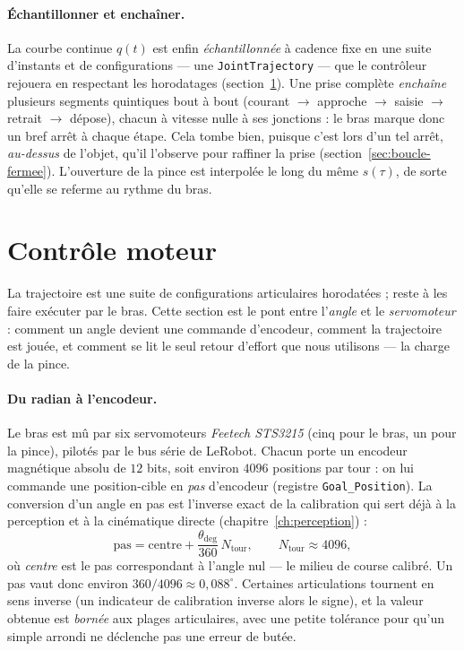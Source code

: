 \paragraph{Échantillonner et enchaîner.} La courbe continue $q(t)$ est enfin \emph{échantillonnée} à cadence fixe en une suite d'instants et de configurations --- une \texttt{JointTrajectory} --- que le contrôleur rejouera en respectant les horodatages (section~\ref{sec:moteur}). Une prise complète \emph{enchaîne} plusieurs segments quintiques bout à bout (courant $\to$ approche $\to$ saisie $\to$ retrait $\to$ dépose), chacun à vitesse nulle à ses jonctions : le bras marque donc un bref arrêt à chaque étape. Cela tombe bien, puisque c'est lors d'un tel arrêt, \emph{au-dessus} de l'objet, qu'il l'observe pour raffiner la prise (section~\ref{sec:boucle-fermee}). L'ouverture de la pince est interpolée le long du même $s(\tau)$, de sorte qu'elle se referme au rythme du bras.


\section{Contrôle moteur}
\label{sec:moteur}

La trajectoire est une suite de configurations articulaires horodatées ; reste à les faire exécuter par le bras. Cette section est le pont entre l'\emph{angle} et le \emph{servomoteur} : comment un angle devient une commande d'encodeur, comment la trajectoire est jouée, et comment se lit le seul retour d'effort que nous utilisons --- la charge de la pince.

\paragraph{Du radian à l'encodeur.} Le bras est mû par six servomoteurs \emph{Feetech STS3215} (cinq pour le bras, un pour la pince), pilotés par le bus série de LeRobot. Chacun porte un encodeur magnétique absolu de $12$ bits, soit environ $4096$ positions par tour : on lui commande une position-cible en \emph{pas} d'encodeur (registre \texttt{Goal\_Position}). La conversion d'un angle en pas est l'inverse exact de la calibration qui sert déjà à la perception et à la cinématique directe (chapitre~\ref{ch:perception}) :
\[
  \text{pas} = \text{centre} + \frac{\theta_{\deg}}{360}\, N_{\text{tour}} , \qquad N_{\text{tour}} \approx 4096 ,
\]
où \emph{centre} est le pas correspondant à l'angle nul --- le milieu de course calibré. Un pas vaut donc environ $360/4096 \approx 0{,}088^{\circ}$. Certaines articulations tournent en sens inverse (un indicateur de calibration inverse alors le signe), et la valeur obtenue est \emph{bornée} aux plages articulaires, avec une petite tolérance pour qu'un simple arrondi ne déclenche pas une erreur de butée.


